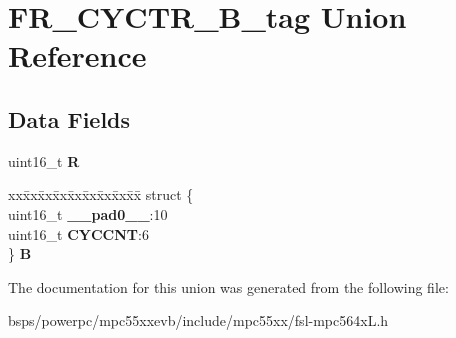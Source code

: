 \hypertarget{unionFR__CYCTR__16B__tag}{}\section{F\+R\+\_\+\+C\+Y\+C\+T\+R\+\_\+B\+\_\+tag Union Reference}
\label{unionFR__CYCTR__16B__tag}
\subsection*{Data Fields}
\begin{DoxyCompactItemize}
\item 
\mbox{\label{unionFR__CYCTR__16B__tag_a9bd904a325de296f33a5c43c6f6c125e}} 
uint16\+\_\+t {\bfseries R}
\item 
\mbox{\label{unionFR__CYCTR__16B__tag_aacbcbd5a23333a35ce06bc6cfb98d0db}} 
\begin{tabbing}
xx\=xx\=xx\=xx\=xx\=xx\=xx\=xx\=xx\=\kill
struct \{\\
\>uint16\_t {\bfseries \_\_pad0\_\_}:10\\
\>uint16\_t {\bfseries CYCCNT}:6\\
\} {\bfseries B}\\

\end{tabbing}\end{DoxyCompactItemize}


The documentation for this union was generated from the following file\+:\begin{DoxyCompactItemize}
\item 
bsps/powerpc/mpc55xxevb/include/mpc55xx/fsl-\/mpc564x\+L.\+h\end{DoxyCompactItemize}
